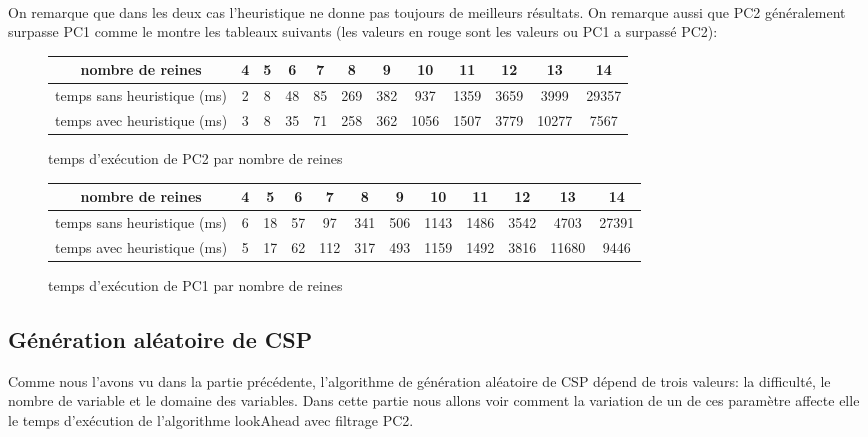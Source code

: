 \documentclass[12pt]{report}
\begin{document}
\paragraph{}
On remarque que dans les deux cas l'heuristique ne donne pas toujours de meilleurs résultats. On remarque aussi que PC2 généralement surpasse PC1 comme le montre les tableaux suivants (les valeurs en rouge sont les valeurs ou PC1 a surpassé PC2):
\begin{figure}[H]
	\begin{tabular}{|c|c|c|c|c|c|c|c|c|c|c|c|}
		\hline
		
		nombre de reines&4&5&6&7&8&9&10&11&12&13&14 \\ \hline
		temps sans heuristique (ms)&2&8&48&85&269&382&937&1359&{\color{red}3659}&3999&{\color{red}29357}\\ \hline
		temps avec heuristique (ms)&3&8&35&71&258&362&1056&{\color{red}1507}&3779&10277&7567\\
		\hline
		
	\end{tabular}%
\caption{temps d'exécution de PC2 par nombre de reines}
\end{figure}
\begin{figure}[H]
	\begin{tabular}{|c|c|c|c|c|c|c|c|c|c|c|c|}
		\hline
		
		nombre de reines&4&5&6&7&8&9&10&11&12&13&14 \\ \hline
		temps sans heuristique (ms)&6&18&57&97&341&506&1143&1486&3542&4703&27391\\ \hline
		temps avec heuristique (ms)&5&17&62&112&317&493&1159&1492&3816&11680&9446\\
		\hline
		
	\end{tabular}%
	\caption{temps d'exécution de PC1 par nombre de reines}
\end{figure}

\subsection{Génération aléatoire de CSP}
Comme nous l’avons vu dans la partie précédente, l’algorithme de génération aléatoire de CSP dépend de trois valeurs: la difficulté, le nombre de variable et le domaine des variables. Dans cette partie nous allons voir comment la variation de un de ces paramètre affecte elle le temps d’exécution de l’algorithme lookAhead avec filtrage PC2.
\end{document}
